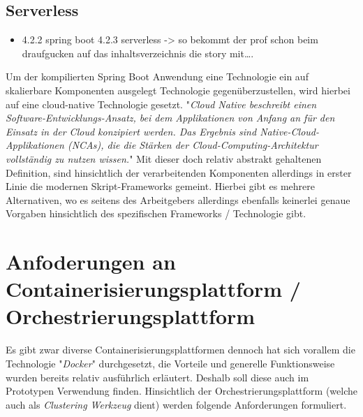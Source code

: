 \subsection{Serverless}
\begin{itemize}
  \item  4.2.2 spring boot 4.2.3 serverless -> so bekommt der prof schon beim draufgucken auf das inhaltsverzeichnis die story mit….
\end{itemize}
Um der kompilierten Spring Boot Anwendung eine Technologie ein auf skalierbare Komponenten ausgelegt Technologie gegenüberzustellen, wird hierbei auf eine cloud-native Technologie gesetzt. "\emph{Cloud Native beschreibt einen Software-Entwicklungs-Ansatz, bei dem Applikationen von Anfang an für den Einsatz in der Cloud konzipiert werden. Das Ergebnis sind Native-Cloud-Applikationen (NCAs), die die Stärken der Cloud-Computing-Architektur vollständig zu nutzen wissen.}" \cite{cn-def} Mit dieser doch relativ abstrakt gehaltenen Definition, sind hinsichtlich der verarbeitenden Komponenten allerdings in erster Linie die modernen Skript-Frameworks gemeint. Hierbei gibt es mehrere Alternativen, wo es seitens des Arbeitgebers allerdings ebenfalls keinerlei genaue Vorgaben hinsichtlich des spezifischen Frameworks / Technologie gibt.

\section{Anfoderungen an Containerisierungsplattform / Orchestrierungsplattform}
Es gibt zwar diverse Containerisierungsplattformen  dennoch hat sich vorallem die Technologie "\emph{Docker}" durchgesetzt, die Vorteile und generelle Funktionsweise wurden bereits relativ ausführlich erläutert. Deshalb soll diese auch im Prototypen Verwendung finden. Hinsichtlich der Orchestrierungsplattform (welche auch als \emph{Clustering Werkzeug} dient) werden folgende Anforderungen formuliert. 

